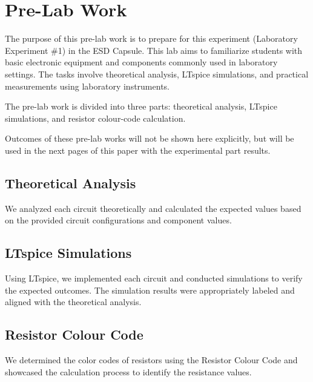 \chapter{Pre-Lab Work}

The purpose of this pre-lab work is to prepare for this experiment (Laboratory Experiment \#1) in the ESD Capsule. This lab aims to familiarize students with basic electronic equipment and components commonly used in laboratory settings. The tasks involve theoretical analysis, LTspice simulations, and practical measurements using laboratory instruments. 

The pre-lab work is divided into three parts: theoretical analysis, LTspice simulations, and resistor colour-code calculation.

Outcomes of these pre-lab works will not be shown here explicitly, but will be used in the next pages of this paper with the experimental part results.

\section{Theoretical Analysis}
We analyzed each circuit theoretically and calculated the expected values based on the provided circuit configurations and component values.

\section{LTspice Simulations}
Using LTspice, we implemented each circuit and conducted simulations to verify the expected outcomes. The simulation results were appropriately labeled and aligned with the theoretical analysis.

\section{Resistor Colour Code}
We determined the color codes of resistors using the Resistor Colour Code and showcased the calculation process to identify the resistance values.
